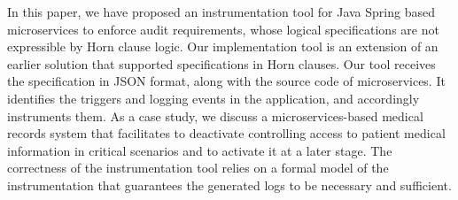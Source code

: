 In this paper, we have proposed an instrumentation tool for Java Spring based microservices to enforce audit requirements, whose logical specifications are not expressible by Horn clause logic. Our implementation tool is an extension of an earlier solution that supported specifications in Horn clauses. Our tool receives the specification in JSON format, along with the source code of microservices. It identifies the triggers and logging events in the application, and accordingly instruments them. As a case study, we discuss a microservices-based medical records system that facilitates to deactivate controlling access to patient medical information in critical scenarios and to activate it at a later stage. The correctness of the instrumentation tool relies on a formal model of the instrumentation that guarantees the generated logs to be necessary and sufficient.



